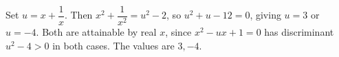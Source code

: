 Set $ u=x+\dfrac{1}{x}$. Then $ x^2+\dfrac{1}{x^2}=u^2-2 $, so $ u^2+u-12=0 $, giving $ u=3 $ or $ u=-4 $. Both are attainable by real $ x $, since $ x^2-ux+1=0 $ has discriminant $ u^2-4>0 $ in both cases. The values are $\boxed{3,-4}$.
